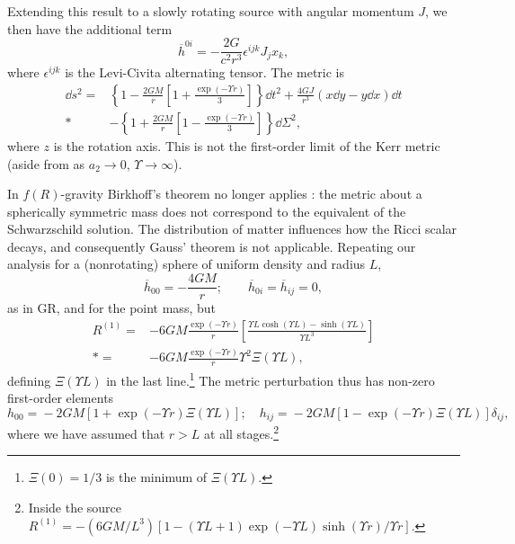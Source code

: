 Extending this result to a slowly rotating source with angular momentum $J$, we then have the additional term \citep[section 13.20]{Hobson2006}
\begin{equation}
\overline{h}^{0i} = -\frac{2G}{c^2r^3} \epsilon^{ijk}J_j x_k,
\end{equation}
where $\epsilon^{ijk}$ is the Levi-Civita alternating tensor. The metric is
\begin{align}
\dd s^2 = {} & \left\{1-\frac{2GM}{r}\left[1 + \frac{\exp(- \Upsilon r)}{3}\right]\right\}\dd t^2 + \frac{4GJ}{r^3}\left(x\dd y - y\dd x\right)\dd t \nonumber \\*
 & - {} \left\{1 +\frac{2GM}{r}\left[1 - \frac{\exp(- \Upsilon r)}{3}\right]\right\}\dd \Sigma^2,\label{eq:f(R)_Kerr}
\end{align}
where $z$ is the rotation axis. This is not the first-order limit of the Kerr metric (aside from as $a_2 \rightarrow 0$, $\Upsilon \rightarrow \infty$).

In $f(R)$-gravity Birkhoff's theorem no longer applies \citep{Pechlaner1966, Stelle1978, Clifton2006, Capozziello2009b, Stabile2010}: the metric about a spherically symmetric mass does not correspond to the equivalent of the Schwarzschild solution. The distribution of matter influences how the Ricci scalar decays, and consequently Gauss' theorem is not applicable. Repeating our analysis for a (nonrotating) sphere of uniform density and radius $L$,
\begin{equation}
\overline{h}_{00} = -\frac{4GM}{r}; \qquad \overline{h}_{0i} = \overline{h}_{ij} = 0,
\end{equation}
as in GR, and for the point mass, but
\begin{align}
R^{(1)} = {} & -6 G M \frac{\exp(- \Upsilon r)}{r}\left[\frac{\Upsilon L\cosh(\Upsilon L) - \sinh(\Upsilon L)}{\Upsilon L^3}\right] \nonumber \\*
 = {} &  -6 G M \frac{\exp(- \Upsilon r)}{r}\Upsilon^2\Xi(\Upsilon L),
\end{align}
defining $\Xi(\Upsilon L)$ in the last line.\footnote{$\Xi(0) = 1/3$ is the minimum of $\Xi(\Upsilon L)$.} The metric perturbation thus has non-zero first-order elements \citep{Stelle1978, Capozziello2009b, Stabile2010}
\begin{equation}
h_{00} = {} -2 G M \left[1 + \exp(- \Upsilon r)\Xi(\Upsilon L)\right]; \quad
h_{ij} = {} -2 G M \left[1 - \exp(- \Upsilon r)\Xi(\Upsilon L)\right]\delta_{ij},
\label{eq:Uniform}
\end{equation}
where we have assumed that $r > L$ at all stages.\footnote{Inside the source $R^{(1)} = -{(6 G M/{L^3})}[1 - (\Upsilon L + 1)\exp(-\Upsilon L) \sinh(\Upsilon r)/\Upsilon r]$.}

